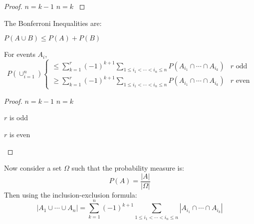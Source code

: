 \documentclass[../Main.tex]{subfiles}
\begin{document}
\begin{proof}
    {$n = k - 1$}{}
    {$n = k$}{
    }
\end{proof}
\begin{propositions}{
        The Bonferroni Inequalities are:
        \label{propsBonferroni}
    }
    \item $P(A \cup B) \leq P(A) + P(B)$
    \item For events $A_i$,
        \begin{equation*}
            P\left(\cup_{i = 1}^n\right)
            \begin{cases}
                \leq \sum_{k=1}^r (-1)^{k+1} \sum_{1 \leq i_1 < \cdots < i_n \leq n} P(A_{i_1} \cap \cdots \cap A_{i_k}) & r \text{ odd} \\
                \geq \sum_{k=1}^r (-1)^{k+1} \sum_{1 \leq i_1 < \cdots < i_n \leq n} P(A_{i_1} \cap \cdots \cap A_{i_k}) & r \text{ even}
            \end{cases}
        \end{equation*}
\end{propositions}
\begin{proof}
    {$n = k - 1$}{}
    {$n = k$}{
        \begin{case}{$r$ is odd}
        \end{case}
        \begin{case}{$r$ is even}
        \end{case}
    }
\end{proof}
Now consider a set $\Omega$ such that the probability measure is:
\begin{equation*}
    P(A) = \frac{|A|}{|\Omega|}
\end{equation*}
Then using the inclusion-exclusion formula:
\begin{equation}
    |A_1 \cup \cdots \cup A_n| = \sum_{k=1}^{n} (-1)^{k+1} \sum_{1 \leq i_1 < \cdots < i_n \leq n} |A_{i_1} \cap \cdots \cap A_{i_k}|
    \label{eqnInclusionExclusionFiniteSets}
\end{equation}
\end{document}
